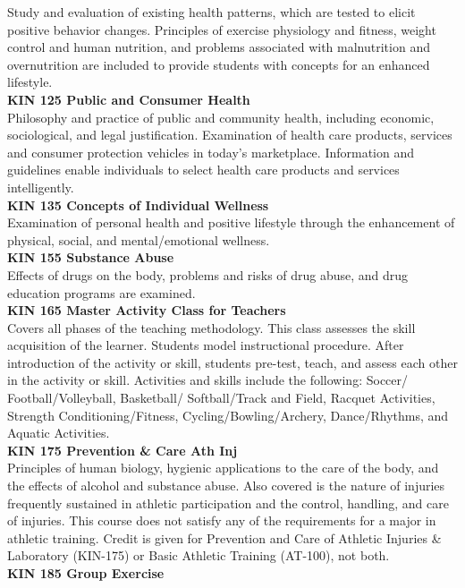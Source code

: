\documentclass[
  letterpaper,
]{scrbook}
\begin{document}
Study and evaluation of existing health patterns, which are tested to
elicit positive behavior changes. Principles of exercise physiology and
fitness, weight control and human nutrition, and problems associated
with malnutrition and overnutrition are included to provide students
with concepts for an enhanced lifestyle.\\
\textbf{KIN 125 Public and Consumer Health}\\
Philosophy and practice of public and community health, including
economic, sociological, and legal justification. Examination of health
care products, services and consumer protection vehicles in today's
marketplace. Information and guidelines enable individuals to select
health care products and services intelligently.\\
\textbf{KIN 135 Concepts of Individual Wellness}\\
Examination of personal health and positive lifestyle through the
enhancement of physical, social, and mental/emotional wellness.\\
\textbf{KIN 155 Substance Abuse}\\
Effects of drugs on the body, problems and risks of drug abuse, and drug
education programs are examined.\\
\textbf{KIN 165 Master Activity Class for Teachers}\\
Covers all phases of the teaching methodology. This class assesses the
skill acquisition of the learner. Students model instructional
procedure. After introduction of the activity or skill, students
pre-test, teach, and assess each other in the activity or skill.
Activities and skills include the following: Soccer/
Football/Volleyball, Basketball/ Softball/Track and Field, Racquet
Activities, Strength Conditioning/Fitness, Cycling/Bowling/Archery,
Dance/Rhythms, and Aquatic Activities.\\
\textbf{KIN 175 Prevention \& Care Ath Inj}\\
Principles of human biology, hygienic applications to the care of the
body, and the effects of alcohol and substance abuse. Also covered is
the nature of injuries frequently sustained in athletic participation
and the control, handling, and care of injuries. This course does not
satisfy any of the requirements for a major in athletic training. Credit
is given for Prevention and Care of Athletic Injuries \& Laboratory
(KIN-175) or Basic Athletic Training (AT-100), not both.\\
\textbf{KIN 185 Group Exercise}\\
\end{document}

